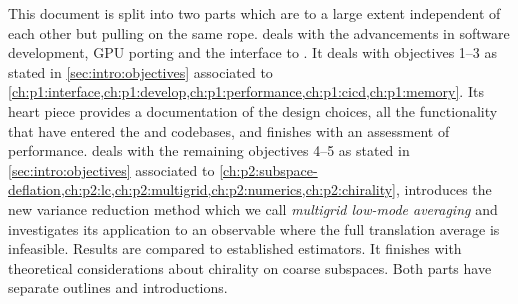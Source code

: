 This document is split into two parts which are to a large extent independent of each other but pulling on the same rope.
 deals with the advancements in software development, GPU porting and the interface to \quda.
It deals with objectives \numrange{1}{3} as stated in \cref{sec:intro:objectives} associated to \cref{ch:p1:interface,ch:p1:develop,ch:p1:performance,ch:p1:cicd,ch:p1:memory}.
Its heart piece provides a documentation of the design choices, all the functionality that have entered the \openqxd and \quda codebases, and finishes with an assessment of performance.
 deals with the remaining objectives \numrange{4}{5} as stated in \cref{sec:intro:objectives} associated to \cref{ch:p2:subspace-deflation,ch:p2:lc,ch:p2:multigrid,ch:p2:numerics,ch:p2:chirality}, introduces the new variance reduction method which we call \emph{multigrid low-mode averaging} and investigates its application to an observable where the full translation average is infeasible.
Results are compared to established estimators.
It finishes with theoretical considerations about chirality on coarse subspaces.
Both parts have separate outlines and introductions.
